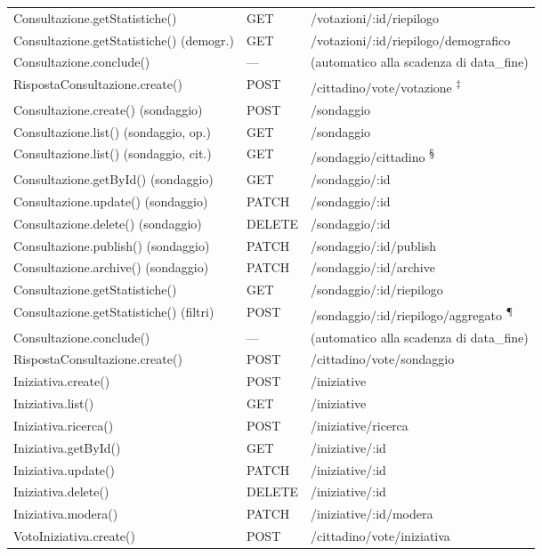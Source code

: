 \documentclass[12pt, a4paper]{article}
\begin{document}
\begin{longtable}{>{\ttfamily\small}p{} p{} >{\ttfamily\small}p{}}
  Consultazione.getStatistiche() & GET & /votazioni/:id/riepilogo \\
  Consultazione.getStatistiche() (demogr.) & GET & /votazioni/:id/riepilogo/demografico \\
  Consultazione.conclude() & — & (automatico alla scadenza di data\_fine) \\
  RispostaConsultazione.create() & POST & /cittadino/vote/votazione \textsuperscript{‡} \\
  \addlinespace
  Consultazione.create() (sondaggio) & POST & /sondaggio \\
  Consultazione.list() (sondaggio, op.) & GET & /sondaggio \\
  Consultazione.list() (sondaggio, cit.) & GET & /sondaggio/cittadino \textsuperscript{§} \\
  Consultazione.getById() (sondaggio) & GET & /sondaggio/:id \\
  Consultazione.update() (sondaggio) & PATCH & /sondaggio/:id \\
  Consultazione.delete() (sondaggio) & DELETE & /sondaggio/:id \\
  Consultazione.publish() (sondaggio) & PATCH & /sondaggio/:id/publish \\
  Consultazione.archive() (sondaggio) & PATCH & /sondaggio/:id/archive \\
  Consultazione.getStatistiche() & GET & /sondaggio/:id/riepilogo \\
  Consultazione.getStatistiche() (filtri) & POST & /sondaggio/:id/riepilogo/aggregato \textsuperscript{¶} \\
  Consultazione.conclude() & — & (automatico alla scadenza di data\_fine) \\
  RispostaConsultazione.create() & POST & /cittadino/vote/sondaggio \\
  \addlinespace
  Iniziativa.create() & POST & /iniziative \\
  Iniziativa.list() & GET & /iniziative \\
  Iniziativa.ricerca() & POST & /iniziative/ricerca \\
  Iniziativa.getById() & GET & /iniziative/:id \\
  Iniziativa.update() & PATCH & /iniziative/:id \\
  Iniziativa.delete() & DELETE & /iniziative/:id \\
  Iniziativa.modera() & PATCH & /iniziative/:id/modera \\
  VotoIniziativa.create() & POST & /cittadino/vote/iniziativa \\

\end{longtable}
\end{document}
